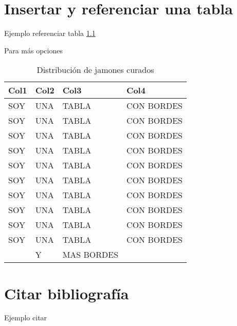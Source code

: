\documentclass[12pt,a4paper,twoside]{article} %
\begin{document}
\pagebreak
{}
\chapter{\textbf{Insertar y referenciar una tabla\\}}
Ejemplo referenciar tabla \ref{tab:tablaEj}

Para más opciones \cite{tables} \par
\begin{table}[H]
\centering
\begin{tabular}{|l|l|l|l|}
\hline
 Col1 & Col2 & Col3  & Col4 \\ \hline
SOY &  UNA & TABLA & CON BORDES \\
SOY &  UNA & TABLA & CON BORDES \\
SOY &  UNA & TABLA & CON BORDES \\
SOY &  UNA & TABLA & CON BORDES \\
SOY &  UNA & TABLA & CON BORDES \\
SOY &  UNA & TABLA & CON BORDES \\
SOY &  UNA & TABLA & CON BORDES \\
SOY &  UNA & TABLA & CON BORDES \\
SOY &  UNA & TABLA & CON BORDES \\
SOY &  UNA & TABLA & CON BORDES \\ \hline
 & Y & MAS BORDES & \\
\hline
\end{tabular}
\caption[table]{Distribución de jamones curados}
\label{tab:tablaEj}
\end{table} 


\chapter{\textbf{Citar bibliografía\\}}

Ejemplo citar \cite{haut2016cloud}

\pagebreak
\thispagestyle{empty}
\pagestyle{empty}

%

\end{document}
